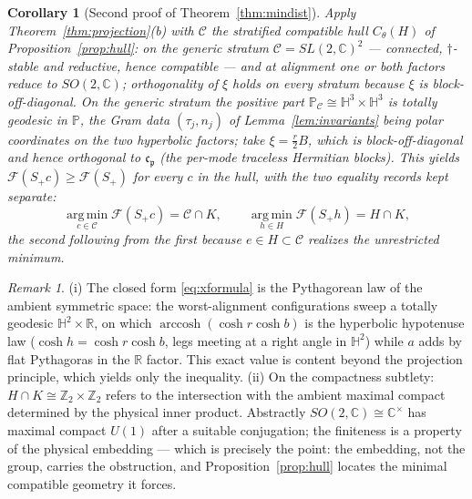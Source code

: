 \documentclass[11pt]{article}
\newtheorem{corollary}[theorem]{Corollary}
\theoremstyle{definition}
\theoremstyle{remark}
\newtheorem{remark}[theorem]{Remark}
\newcommand{\C}{\mathbb{C}}
\newcommand{\R}{\mathbb{R}}
\newcommand{\Z}{\mathbb{Z}}
\newcommand{\dg}{\dagger}
\newcommand{\arccosh}{\operatorname{arccosh}}
\begin{document}
\begin{corollary}[Second proof of Theorem~\ref{thm:mindist}]
\label{cor:secondproof}
Apply Theorem~\ref{thm:projection}(b) with $\mathcal C$ the stratified
compatible hull $C_\theta(H)$ of Proposition~\ref{prop:hull}: on the
generic stratum $\mathcal C=SL(2,\C)^2$ --- connected, $\dg$-stable and
reductive, hence compatible --- and at alignment one or both factors
reduce to $SO(2,\C)$; orthogonality of $\xi$ holds on every stratum
because $\xi$ is block-off-diagonal.  On the generic stratum the positive
part $\mathbb P_{\mathcal C}\cong\mathbb H^3\times\mathbb H^3$ is totally
geodesic in $\mathbb P$, the Gram data $(\tau_j,n_j)$ of
Lemma~\ref{lem:invariants} being polar coordinates on the two hyperbolic
factors; take $\xi=\tfrac r2B$, which is block-off-diagonal and hence
orthogonal to $\mathfrak c_{\mathfrak p}$ (the per-mode traceless Hermitian
blocks).  This yields $\mathcal F(S_+c)\ge\mathcal F(S_+)$ for every $c$ in the
hull, with the two equality records kept separate:
\begin{equation}
\operatorname*{arg\,min}_{c\in\mathcal C}\mathcal F(S_+c)=\mathcal C\cap K,
\qquad
\operatorname*{arg\,min}_{h\in H}\mathcal F(S_+h)=H\cap K ,
\end{equation}
the second following from the first because $e\in H\subset\mathcal C$
realizes the unrestricted minimum.
\end{corollary}

\begin{remark}\label{rem:pythagoras}
(i) The closed form \eqref{eq:xformula} is the Pythagorean law of the
ambient symmetric space: the worst-alignment configurations sweep a totally
geodesic $\mathbb H^2\times\R$, on which
$\arccosh(\cosh r\cosh b)$ is the hyperbolic hypotenuse law
($\cosh h=\cosh r\cosh b$, legs meeting at a right angle in $\mathbb H^2$)
while $a$ adds by flat Pythagoras in the $\R$ factor.  This exact value is
content beyond the projection principle, which yields only the inequality.
(ii) On the compactness subtlety: $H\cap K\cong\Z_2\times\Z_2$ refers to the
intersection with the ambient maximal compact determined by the physical
inner product.  Abstractly $SO(2,\C)\cong\C^{\times}$ has maximal compact
$U(1)$ after a suitable conjugation; the finiteness is a property of the
physical embedding --- which is precisely the point: the embedding, not the
group, carries the obstruction, and Proposition~\ref{prop:hull} locates the
minimal compatible geometry it forces.
\end{remark}
\end{document}
